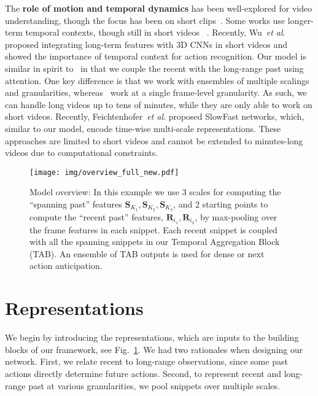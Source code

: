 \documentclass[runningheads]{llncs}
\newcommand{\etal}{\textit{et al}. }
\begin{document}
The \textbf{role of motion and temporal dynamics} has been well-explored for video understanding, though the focus has been on short clips~\cite{lin2019tsm,carreira2017quo,huang2018makes}. Some works use longer-term temporal contexts, though still in short videos  ~\cite{li2017temporal,nonlocalNetVLAD}. Recently, Wu~\etal\cite{lfb2019} proposed integrating long-term features with 3D CNNs in short videos and showed the importance of temporal context for action recognition. Our model is similar in spirit to~\cite{lfb2019} in that we couple the recent with the long-range past using attention. One key difference is that we work with ensembles of multiple scalings and granularities, whereas~\cite{lfb2019} work at a single frame-level granularity. As such, we can handle long videos up to tens of minutes, while they are only able to work on short videos. Recently, Feichtenhofer~\etal\cite{feichtenhofer2019slowfast} proposed SlowFast networks, which, similar to our model, encode time-wise multi-scale representations.  These approaches are limited to short videos and cannot be extended to minutes-long videos due to computational constraints. 

\begin{figure} 
\centering 
\texttt{[image: img/overview\_full\_new.pdf]}
\caption{Model overview: In this example we use 3 scales for computing the ``spanning past'' features $\mathbf{S}_{K_1}, \mathbf{S}_{K_2}, \mathbf{S}_{K_3}$, and 2 starting points to compute the ``recent past'' features, $\mathbf{R}_{i_1}, \mathbf{R}_{i_2}$, by max-pooling over the frame features in each snippet. Each recent snippet is coupled with all the spanning snippets in our Temporal Aggregation Block (TAB). An ensemble of TAB outputs is used for dense or next action anticipation.}
\label{fig:overview_new}
\end{figure}

\section{Representations}
We begin by introducing the representations, which are inputs to the building blocks of our framework, see Fig.~\ref{fig:overview_new}. We had two rationales when designing our network. First, we relate recent to long-range observations, since some past actions directly determine future actions. Second, to represent recent and long-range past at various granularities, we pool snippets over multiple scales. 
  
\end{document}
